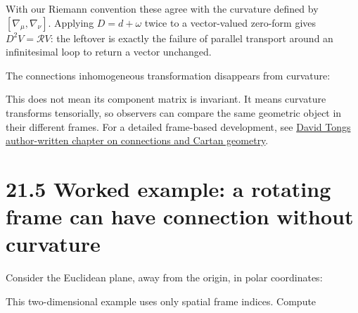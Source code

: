 \documentclass[
  11pt,
  letterpaper,
  oneside,
  openany]{scrbook}
\begin{document}
With our Riemann convention these agree with the curvature defined by
\([\nabla_\mu,\nabla_\nu]\). Applying \(D=d+\omega\) twice to a
vector-valued zero-form gives \(D^2V=\mathcal R V\): the leftover is
exactly the failure of parallel transport around an infinitesimal loop
to return a vector unchanged.

The connection\textquotesingle s inhomogeneous transformation disappears
from curvature:

\begin{center}
\begingroup
{}
\ifdim\wd\grmathbox>\linewidth
\resizebox{\linewidth}{!}{\usebox{\grmathbox}}
\else\usebox{\grmathbox}\fi
\endgroup
\end{center}

This does not mean its component matrix is invariant. It means curvature
transforms tensorially, so observers can compare the same geometric
object in their different frames. For a detailed frame-based
development, see
\href{https://davidtong.org/teaching/general-relativity/grhtml/S3}{David
Tong\textquotesingle s author-written chapter on connections and Cartan
geometry}.

\hypertarget{worked-example-a-rotating-frame-can-have-connection-without-curvature}{%
\section{21.5 Worked example: a rotating frame can have connection
without
curvature}\label{worked-example-a-rotating-frame-can-have-connection-without-curvature}}

Consider the Euclidean plane, away from the origin, in polar
coordinates:

\begin{center}
\begingroup
{}
\ifdim\wd\grmathbox>\linewidth
\resizebox{\linewidth}{!}{\usebox{\grmathbox}}
\else\usebox{\grmathbox}\fi
\endgroup
\end{center}

This two-dimensional example uses only spatial frame indices. Compute

\begin{center}
\begingroup
{}
\ifdim\wd\grmathbox>\linewidth
\resizebox{\linewidth}{!}{\usebox{\grmathbox}}
\else\usebox{\grmathbox}\fi
\endgroup
\end{center}
\end{document}
